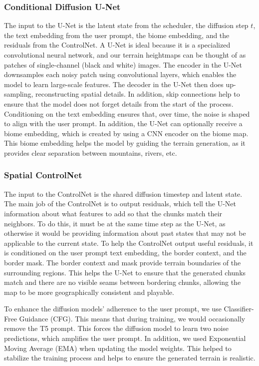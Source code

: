 \documentclass[conference]{IEEEtran}
\begin{document}
\subsubsection{Conditional Diffusion U-Net}
The input to the U-Net is the latent state from the scheduler, the diffusion step \(t\), the text embedding from the user prompt, the biome embedding, and the residuals from the ControlNet. A U-Net is ideal because it is a specialized convolutional neural network, and our terrain heightmaps can be thought of as patches of single-channel (black and white) images. The encoder in the U-Net downsamples each noisy patch using convolutional layers, which enables the model to learn large-scale features. The decoder in the U-Net then does up-sampling, reconstructing spatial details. In addition, skip connections help to ensure that the model does not forget details from the start of the process. Conditioning on the text embedding ensures that, over time, the noise is shaped to align with the user prompt. In addition, the U-Net can optionally receive a biome embedding, which is created by using a CNN encoder on the biome map. This biome embedding helps the model by guiding the terrain generation, as it provides clear separation between mountains, rivers, etc.

\subsubsection{Spatial ControlNet}
The input to the ControlNet is the shared diffusion timestep and latent state. The main job of the ControlNet is to output residuals, which tell the U-Net information about what features to add so that the chunks match their neighbors. To do this, it must be at the same time step as the U-Net, as otherwise it would be providing information about past states that may not be applicable to the current state. To help the ControlNet output useful residuals, it is conditioned on the user prompt text embedding, the border context, and the border mask. The border context and mask provide terrain boundaries of the surrounding regions. This helps the U-Net to ensure that the generated chunks match and there are no visible seams between bordering chunks, allowing the map to be more geographically consistent and playable. 

To enhance the diffusion models' adherence to the user prompt, we use Classifier-Free Guidance (CFG). This means that during training, we would occasionally remove the T5 prompt. This forces the diffusion model to learn two noise predictions, which amplifies the user prompt. In addition, we used Exponential Moving Average (EMA) when updating the model weights. This helped to stabilize the training process and helps to ensure the generated terrain is realistic.
\end{document}
